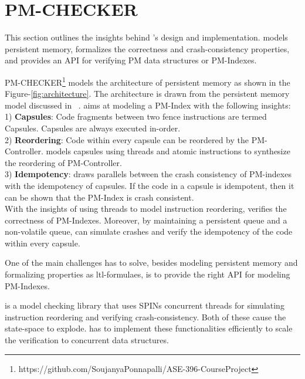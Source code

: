 \section{PM-CHECKER}

This section outlines the insights behind \checker's design and implementation.
\Checker models persistent memory, formalizes the correctness and
crash-consistency properties, and provides an API for verifying PM data
structures or PM-Indexes.



PM-CHECKER\footnote{https://github.com/SoujanyaPonnapalli/ASE-396-CourseProject}
models the architecture of persistent memory as shown in the
Figure-\ref{fig:architecture}. The architecture is drawn from the persistent
memory model discussed in ~\cite{blelloch2018parallel}. \Checker aims at
modeling a PM-Index with the following insights:\\
1) \textbf{Capsules}: Code fragments between two fence instructions are termed
Capsules. Capsules are always executed in-order.\\
2) \textbf{Reordering}: Code within every capsule can be reordered by the
PM-Controller. \Checker models capsules using threads and atomic instructions to
synthesize the reordering of PM-Controller.\\
3) \textbf{Idempotency}: \Checker draws parallels between the crash
consistency of PM-indexes with the idempotency of capsules. If the code in a
capsule is idempotent, then it can be shown that the PM-Index is crash
consistent.\\

With the insights of using threads to model instruction reordering, \checker
verifies the correctness of PM-Indexes. Moreover, by maintaining a persistent
queue and a non-volatile queue, \checker can simulate crashes and verify the
idempotency of the code within every capsule.

One of the main challenges \checker has to solve, besides modeling persistent
memory and formalizing properties as ltl-formulaes, is to provide the right API
for modeling PM-Indexes.

\Checker is a model checking library that uses SPINs concurrent threads for
simulating instruction reordering and verifying crash-consistency. Both of these
cause the state-space to explode. \Checker has to implement these
functionalities efficiently to scale the verification to concurrent data
structures.

